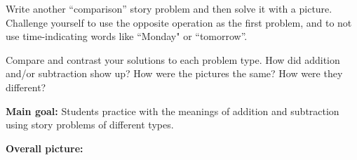 \documentclass[nooutcomes,noauthor,handout]{ximera}
\begin{document}
\begin{problem}
Write another ``comparison'' story problem and then solve it with a picture. Challenge yourself to use the opposite operation as the first problem, and to not use time-indicating words like ``Monday" or ``tomorrow''.
\end{problem}

\begin{problem}
Compare and contrast your solutions to each problem type. How did addition and/or subtraction show up? How were the pictures the same? How were they different?
\end{problem}




\newpage
\begin{instructorNotes}

{\bf Main goal:} Students practice with the meanings of addition and subtraction using story problems of different types.

{\bf Overall picture:} 


\end{instructorNotes}
\end{document}
